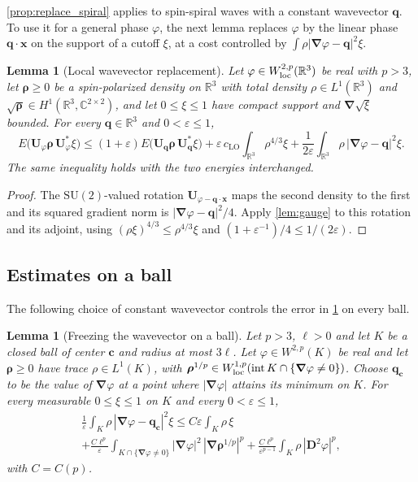 \documentclass[final,reqno]{amsart}
\newtheorem{lemma}[theorem]{Lemma}
\theoremstyle{remark}
\renewcommand{\le}{\leqslant}
\renewcommand{\ge}{\geqslant}
\renewcommand{\epsilon}{\varepsilon}
\DeclareMathOperator{\Int}{int}
\newcommand{\RR}{\mathbb{R}}
\newcommand{\CC}{\mathbb{C}}
\newcommand{\SU}{\mathrm{SU}}
\newcommand{\LO}{\mathrm{LO}}
\newcommand{\grad}{\bm{\nabla}}
\begin{document}
\cref{prop:replace_spiral} applies to spin-spiral waves with a constant wavevector $\mathbf{q}$. To use it for a general phase $\varphi$, the next lemma replaces $\varphi$ by the linear phase $\mathbf{q}\cdot\mathbf{x}$ on the support of a cutoff $\xi$, at a cost controlled by $\int\rho|\grad\varphi-\mathbf{q}|^2\xi$.

\begin{lemma}[Local wavevector replacement]\label{lem:constant_wavevector}
Let $\varphi\in W^{2,p}_{\rm loc}(\RR^3)$ be real with $p>3$, let $\bm{\rho}\ge0$ be a spin-polarized density on $\RR^3$ with total density $\rho\in L^1(\RR^3)$ and $\sqrt{\bm{\rho}}\in H^1(\RR^3,\CC^{2\times2})$, and let $0\le\xi\le1$ have compact support and $\grad\sqrt\xi$ bounded. For every $\mathbf{q}\in\RR^3$ and $0<\epsilon\le1$,
\begin{equation*}
E\big(\mathbf{U}_\varphi\bm{\rho}\,\mathbf{U}_\varphi^*\xi\big)
\le(1+\epsilon)E\big(\mathbf{U}_{\mathbf{q}}\bm{\rho}\,\mathbf{U}_{\mathbf{q}}^*\xi\big)
+\epsilon\,c_\LO\int_{\RR^3}\rho^{4/3}\xi
+\frac1{2\epsilon}\int_{\RR^3}\rho\,|\grad\varphi-\mathbf{q}|^2\xi .
\end{equation*}
The same inequality holds with the two energies interchanged.
\end{lemma}

\begin{proof}
The $\SU(2)$-valued rotation $\mathbf{U}_{\varphi-\mathbf{q}\cdot\mathbf{x}}$ maps the second density to the first and its squared gradient norm is $|\grad\varphi-\mathbf{q}|^2/4$. Apply \cref{lem:gauge} to this rotation and its adjoint, using $(\rho\xi)^{4/3}\le\rho^{4/3}\xi$ and $(1+\epsilon^{-1})/4\le1/(2\epsilon)$.
\end{proof}

\subsection{Estimates on a ball}\label{sec:ball_estimates}
The following choice of constant wavevector controls the error in \cref{lem:constant_wavevector} on every ball.

\begin{lemma}[Freezing the wavevector on a ball]\label{lem:weighted_wavevector}
Let $p>3$, $\ell>0$ and let $K$ be a closed ball of center $\mathbf{c}$ and radius at most $3\ell$. Let $\varphi\in W^{2,p}(K)$ be real and let $\bm{\rho}\ge0$ have trace $\rho\in L^1(K)$, with $\bm{\rho}^{1/p}\in W^{1,p}_{\rm loc}(\Int K\cap\{\grad\varphi\ne0\})$. Choose $\mathbf{q}_{\mathbf{c}}$ to be the value of $\grad\varphi$ at a point where $|\grad\varphi|$ attains its minimum on $K$. For every measurable $0\le\xi\le1$ on $K$ and every $0<\epsilon\le1$,
\begin{multline}\label{eq:weighted_wavevector}
\frac1\epsilon\int_K\rho\,|\grad\varphi-\mathbf{q}_{\mathbf{c}}|^2\xi
\le C\epsilon\int_K\rho\,\xi\\
+\frac{C\ell^p}{\epsilon}\int_{K\cap\{\grad\varphi\ne0\}}|\grad\varphi|^2\,|\grad\bm{\rho}^{1/p}|^p
+\frac{C\ell^p}{\epsilon^{p-1}}\int_K\rho\,|\mathbf{D}^2\varphi|^p ,
\end{multline}
with $C=C(p)$.
\end{lemma}
\end{document}
